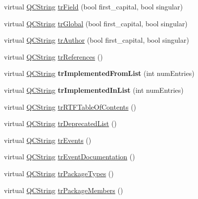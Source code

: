 \begin{DoxyCompactItemize}
virtual \mbox{\hyperlink{class_q_c_string}{Q\+C\+String}} \mbox{\hyperlink{class_translator_polish_a6c534eb7b76b7bc38edc52275a5be426}{tr\+Field}} (bool first\+\_\+capital, bool singular)
\item 
virtual \mbox{\hyperlink{class_q_c_string}{Q\+C\+String}} \mbox{\hyperlink{class_translator_polish_a62f2f17d8585f65081cc9fd3f5091f4f}{tr\+Global}} (bool first\+\_\+capital, bool singular)
\item 
virtual \mbox{\hyperlink{class_q_c_string}{Q\+C\+String}} \mbox{\hyperlink{class_translator_polish_ad18ec9733cbb0c05a354fe60937f4fe4}{tr\+Author}} (bool first\+\_\+capital, bool singular)
\item 
virtual \mbox{\hyperlink{class_q_c_string}{Q\+C\+String}} \mbox{\hyperlink{class_translator_polish_ac65e96984474e5afde06e8df1dae5762}{tr\+References}} ()
\item 
\mbox{\label{class_translator_polish_aba87d564d05a4066850f11637dd37c05}} 
virtual \mbox{\hyperlink{class_q_c_string}{Q\+C\+String}} {\bfseries tr\+Implemented\+From\+List} (int num\+Entries)
\item 
\mbox{\label{class_translator_polish_aabf2e141126f09588ba6eef99452ada0}} 
virtual \mbox{\hyperlink{class_q_c_string}{Q\+C\+String}} {\bfseries tr\+Implemented\+In\+List} (int num\+Entries)
\item 
virtual \mbox{\hyperlink{class_q_c_string}{Q\+C\+String}} \mbox{\hyperlink{class_translator_polish_af4e57021ac2b8b4264276039c9134038}{tr\+R\+T\+F\+Table\+Of\+Contents}} ()
\item 
virtual \mbox{\hyperlink{class_q_c_string}{Q\+C\+String}} \mbox{\hyperlink{class_translator_polish_a3a930e05e40b606dffdab1ab7c25d3e8}{tr\+Deprecated\+List}} ()
\item 
virtual \mbox{\hyperlink{class_q_c_string}{Q\+C\+String}} \mbox{\hyperlink{class_translator_polish_ac399b9cdd43e225d284bddcd4f3bdabb}{tr\+Events}} ()
\item 
virtual \mbox{\hyperlink{class_q_c_string}{Q\+C\+String}} \mbox{\hyperlink{class_translator_polish_a9a1e00b24df09230de3ca0ebb2cb7b1f}{tr\+Event\+Documentation}} ()
\item 
virtual \mbox{\hyperlink{class_q_c_string}{Q\+C\+String}} \mbox{\hyperlink{class_translator_polish_aa9362c48b5a6b3c16a587a46757998a9}{tr\+Package\+Types}} ()
\item 
virtual \mbox{\hyperlink{class_q_c_string}{Q\+C\+String}} \mbox{\hyperlink{class_translator_polish_a7d1f6166319d89187e41c0173765e4fe}{tr\+Package\+Members}} ()

\end{DoxyCompactItemize}
